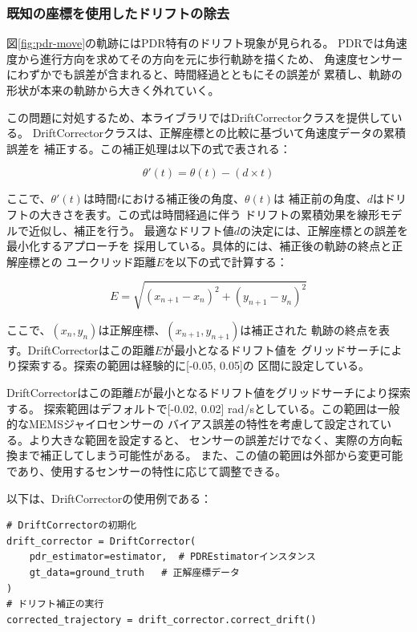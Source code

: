 \subsubsection{既知の座標を使用したドリフトの除去}

図\ref{fig:pdr-move}の軌跡にはPDR特有のドリフト現象が見られる。
PDRでは角速度から進行方向を求めてその方向を元に歩行軌跡を描くため、
角速度センサーにわずかでも誤差が含まれると、時間経過とともにその誤差が
累積し、軌跡の形状が本来の軌跡から大きく外れていく。

この問題に対処するため、本ライブラリではDriftCorrectorクラスを提供している。
DriftCorrectorクラスは、正解座標との比較に基づいて角速度データの累積誤差を
補正する。この補正処理は以下の式で表される：

\begin{equation}
    \theta'(t) = \theta(t) - (d \times t)
\end{equation}

ここで、$\theta'(t)$は時間$t$における補正後の角度、$\theta(t)$は
補正前の角度、$d$はドリフトの大きさを表す。この式は時間経過に伴う
ドリフトの累積効果を線形モデルで近似し、補正を行う。
最適なドリフト値$d$の決定には、正解座標との誤差を最小化するアプローチを
採用している。具体的には、補正後の軌跡の終点と正解座標との
ユークリッド距離$E$を以下の式で計算する：

\begin{equation}
    E = \sqrt{(x_{n+1} - x_n)^2 + (y_{n+1} - y_n)^2}
\end{equation}

ここで、$(x_n, y_n)$は正解座標、$(x_{n+1}, y_{n+1})$は補正された
軌跡の終点を表す。DriftCorrectorはこの距離$E$が最小となるドリフト値を
グリッドサーチにより探索する。探索の範囲は経験的に[-0.05, 0.05]の
区間に設定している。

DriftCorrectorはこの距離$E$が最小となるドリフト値をグリッドサーチにより探索する。
探索範囲はデフォルトで[-0.02, 0.02] rad/sとしている。この範囲は一般的なMEMSジャイロセンサーの
バイアス誤差の特性を考慮して設定されている。より大きな範囲を設定すると、
センサーの誤差だけでなく、実際の方向転換まで補正してしまう可能性がある。
また、この値の範囲は外部から変更可能であり、使用するセンサーの特性に応じて調整できる。

以下は、DriftCorrectorの使用例である：
\begin{lstlisting}
# DriftCorrectorの初期化
drift_corrector = DriftCorrector(
    pdr_estimator=estimator,  # PDREstimatorインスタンス
    gt_data=ground_truth   # 正解座標データ
)
# ドリフト補正の実行
corrected_trajectory = drift_corrector.correct_drift()
\end{lstlisting}

